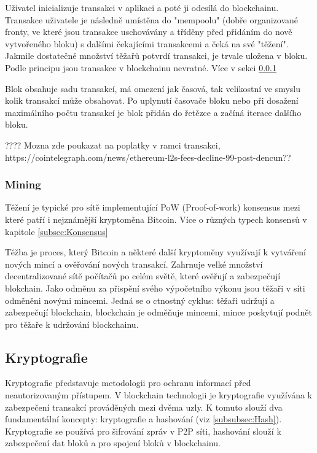 Uživatel inicializuje transakci v aplikaci a poté ji odesílá do blockchainu. Transakce uživatele je následně umístěna do "mempoolu" (dobře organizované fronty, ve které jsou transakce uschovávány a tříděny před přidáním do nově vytvořeného bloku) s dalšími čekajícími transakcemi a čeká na své "těžení". Jakmile dostatečné množství těžařů potvrdí transakci, je trvale uložena v bloku. Podle principu jsou transakce v blockchainu nevratné. Více v sekci \ref{subsubsec:Mining}

Blok obsahuje sadu transakcí, má omezení jak časová, tak velikostní ve smyslu kolik transakcí může obsahovat. Po uplynutí časovače bloku nebo při dosažení maximálního počtu transakcí je blok přidán do řetězce a začíná iterace dalšího bloku. \cite{Transakce}


???? Mozna zde poukazat na poplatky v ramci transakci, https://cointelegraph.com/news/ethereum-l2s-fees-decline-99-post-dencun??


\subsubsection{Mining}\label{subsubsec:Mining}
Těžení je typické pro sítě implementující PoW (Proof-of-work) konsensus mezi které patří i nejznámější kryptoměna Bitcoin. Více o různých typech konsensů v kapitole \ref{subsec:Konsensus}

Těžba je proces, který Bitcoin a některé další kryptoměny využívají k vytváření nových mincí a ověřování nových transakcí. Zahrnuje velké množství decentralizované sítě počítačů po celém světě, které ověřují a zabezpečují blokchain. Jako odměnu za přispění svého výpočetního výkonu jsou těžaři v síti odměněni novými mincemi. Jedná se o ctnostný cyklus: těžaři udržují a zabezpečují blockchain, blockchain je odměňuje mincemi, mince poskytují podnět pro těžaře k udržování blockchainu. \cite{Mining}



\subsection{Kryptografie}
Kryptografie představuje metodologii pro ochranu informací před neautorizovaným přístupem. V blockchain technologii je kryptografie využívána k zabezpečení transakcí prováděných mezi dvěma uzly. K tomuto slouží dva fundamentální koncepty: kryptografie a hashování (viz \ref{subsubsec:Hash}). Kryptografie se používá pro šifrování zpráv v P2P síti, hashování slouží k zabezpečení dat bloků a pro spojení bloků v blockchainu.

